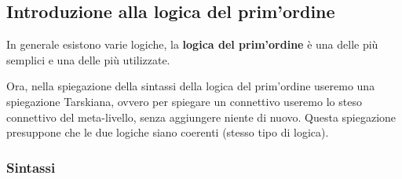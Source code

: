 \documentclass[
  a4paper,
]{article}
\begin{document}
\hypertarget{introduzione-alla-logica-del-primordine}{%
\subsection{Introduzione alla logica del
prim'ordine}\label{introduzione-alla-logica-del-primordine}}

In generale esistono varie logiche, la \textbf{logica del prim'ordine} è
una delle più semplici e una delle più utilizzate.

Ora, nella spiegazione della sintassi della logica del prim'ordine
useremo una spiegazione Tarskiana, ovvero per spiegare un connettivo
useremo lo steso connettivo del meta-livello, senza aggiungere niente di
nuovo. Questa spiegazione presuppone che le due logiche siano coerenti
(stesso tipo di logica).

\hypertarget{sintassi}{%
\subsubsection{Sintassi}\label{sintassi}}
\end{document}
